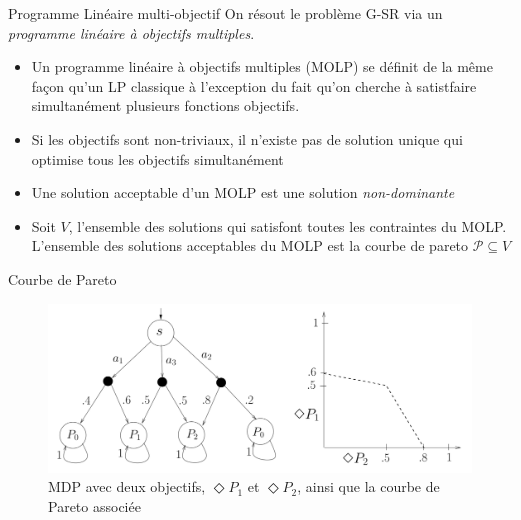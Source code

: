 \documentclass[compress]{beamer}
\theoremstyle{theorem}%
\begin{document}
\begin{frame}{Programme Linéaire multi-objectif}
\footnotesize
  On résout le problème G-SR via un \textit{\color{fibeamer@orange}programme linéaire à objectifs multiples}.
  \begin{itemize}
    \item Un programme linéaire à objectifs multiples (MOLP) se définit de la même façon qu'un LP classique à l'exception du fait qu'on cherche à satistfaire \alert{simultanément} plusieurs fonctions objectifs.
    \item Si les objectifs sont non-triviaux, \alert{il n'existe pas de solution unique qui optimise tous les objectifs simultanément}
    \item Une solution acceptable d'un MOLP est une solution \textit{non-dominante}
    \item Soit $V$, l'ensemble des solutions qui satisfont toutes les
      contraintes du MOLP. L'ensemble des solutions acceptables du MOLP est la courbe de pareto $\mathcal{P} \subseteq V$
  \end{itemize}
\end{frame}

\begin{frame}{Courbe de Pareto}
  \begin{figure}
    \includegraphics[width=\linewidth]{resources/pareto}
    \caption{MDP avec deux objectifs, $\Diamond P_1$ et $\Diamond P_2$, ainsi que la courbe de Pareto associée \cite{KYV}}
  \end{figure}
\end{frame}
\end{document}
